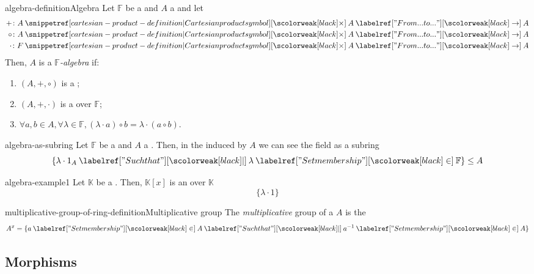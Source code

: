 \documentclass[preview]{standalone}
\begin{document}

\begin{snippetdefinition}{algebra-definition}{Algebra}
    Let \(\mathbb{F}\) be a \field and \(A\) a \set and let
    \begin{align*}
        + \colon A \cartesianprod A \fromto A \\
        \circ \colon A \cartesianprod A \fromto A \\
        \cdot \colon F \cartesianprod A \fromto A
    \end{align*}
    Then, \(A\) is a \emph{\(\mathbb{F}\)-algebra} if:
    \begin{enumerate}
        \item \((A, +, \circ)\) is a \ring;
        \item \((A, +, \cdot)\) is a \vectorspace over \(\mathbb{F}\);
        \item \(\forall a,b \in A, \forall \lambda \in \mathbb{F}, (\lambda \cdot a) \circ b = \lambda \cdot (a\circ b)\).
    \end{enumerate}
\end{snippetdefinition}

\begin{snippet}{algebra-as-subring}
    Let \(\mathbb{F}\) be a \field and \(A\) a \ring.
    Then, in the \algebra induced by \(A\)
    we can see the field as a subring
    \[
        \{\lambda \cdot 1_A \suchthat \lambda \in \mathbb{F}\} \leq A
    \]
\end{snippet}

\begin{snippetexample}{algebra-example1}{}
    Let \(\mathbb{K}\) be a \field.
    Then, \(\mathbb{K}[x]\) is an \algebra over \(\mathbb{K}\)
    \[
        \{\lambda \cdot 1\}
    \]
\end{snippetexample}

\begin{snippetdefinition}{multiplicative-group-of-ring-definition}{Multiplicative group}
    The \emph{multiplicative} group of a \ring \(A\)
    is the \group
    \[
        A^x = \{
            a \in A \suchthat a^{-1} \in A    
        \}
    \]
\end{snippetdefinition}

\subsection{Morphisms}
\end{document}
